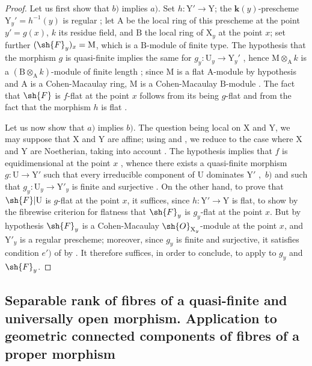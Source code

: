 \begin{proof}
\label{IV.15.4.3-proof}
Let us first show that $b)$ implies $a)$.
Set $h:\mathrm{Y}'\to\mathrm{Y}$; the $\mathbf{k}(y)$-prescheme $\mathrm{Y}_y'=h^{-1}(y)$ is regular ; let $\mathrm{A}$ be the local ring of this prescheme at the point $y'=g(x)$, $k$ its residue field, and $\mathrm{B}$ the local ring of $\mathrm{X}_y$ at the point $x$; set further $(\sh{F}_y)_x=\mathrm{M}$, which is a $\mathrm{B}$-module of finite type.
The hypothesis that the morphism $g$ is quasi-finite implies the same for $g_y:\mathrm{U}_y\to\mathrm{Y}_y'$ , hence $\mathrm{M}\otimes_\mathrm{A} k$ is a $(\mathrm{B}\otimes_\mathrm{A} k)$-module of finite length ; since $\mathrm{M}$ is a flat $\mathrm{A}$-module by hypothesis and $\mathrm{A}$ is a Cohen-Macaulay ring, $\mathrm{M}$ is a Cohen-Macaulay $\mathrm{B}$-module .
The fact that $\sh{F}$ is $f$-flat at the point $x$ follows from its being $g$-flat and from the fact that the morphism $h$ is flat .

Let us now show that $a)$ implies $b)$.
The question being local on $\mathrm{X}$ and $\mathrm{Y}$, we may suppose that $\mathrm{X}$ and $\mathrm{Y}$ are affine; using  and , we reduce to the case where $\mathrm{X}$ and $\mathrm{Y}$ are Noetherian, taking into account .
The hypothesis implies that $f$ is equidimensional at the point $x$ , whence there exists a quasi-finite morphism $g:\mathrm{U}\to\mathrm{Y}'$ such that every irreducible component of $\mathrm{U}$ dominates $\mathrm{Y}'$ ,~$b)$ and such that $g_y:\mathrm{U}_y\to\mathrm{Y}'_y$ is finite and surjective .
On the other hand, to prove that $\sh{F}|\mathrm{U}$ is $g$-flat at the point $x$, it suffices, since $h:\mathrm{Y}'\to\mathrm{Y}$ is flat, to show by the fibrewise criterion for flatness  that $\sh{F}_y$ is $g_y$-flat at the point $x$.
But by hypothesis $\sh{F}_y$ is a Cohen-Macaulay $\sh{O}_{\mathrm{X}_y}$-module at the point $x$, and $\mathrm{Y}'_y$ is a regular prescheme; moreover, since $g_y$ is finite and surjective, it satisfies condition $e')$ of  by .
It therefore suffices, in order to conclude, to apply  to $g_y$ and $\sh{F}_y$.
\end{proof}
\subsection{Separable rank of fibres of a quasi-finite and universally open morphism. Application to geometric connected components of fibres of a proper morphism}
\label{subsection:IV.15.5}

